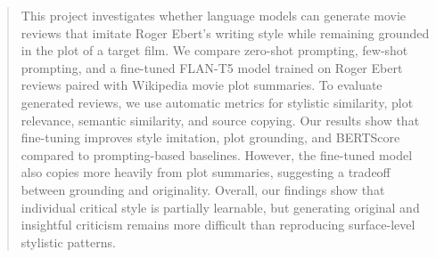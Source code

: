 \begin{abstract}
This project investigates whether language models can generate movie reviews that imitate Roger Ebert's writing style while remaining grounded in the plot of a target film. We compare zero-shot prompting, few-shot prompting, and a fine-tuned FLAN-T5 model trained on Roger Ebert reviews paired with Wikipedia movie plot summaries. To evaluate generated reviews, we use automatic metrics for stylistic similarity, plot relevance, semantic similarity, and source copying. Our results show that fine-tuning improves style imitation, plot grounding, and BERTScore compared to prompting-based baselines. However, the fine-tuned model also copies more heavily from plot summaries, suggesting a tradeoff between grounding and originality. Overall, our findings show that individual critical style is partially learnable, but generating original and insightful criticism remains more difficult than reproducing surface-level stylistic patterns.
\end{abstract}
